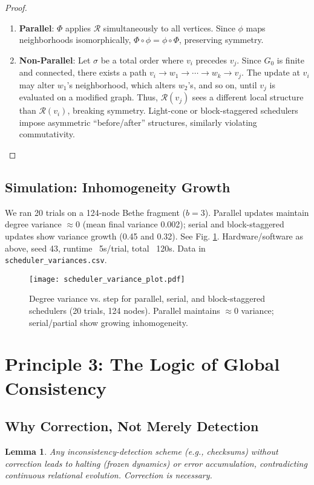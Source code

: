 \documentclass[11pt, a4paper]{article}
\newtheorem{lemma}{Lemma}[section]
\begin{document}
\begin{proof}
\begin{enumerate}
  \item \textbf{Parallel}: $\Phi$ applies $\mathcal{R}$ simultaneously to all vertices. Since $\phi$ maps neighborhoods isomorphically, $\Phi \circ \phi = \phi \circ \Phi$, preserving symmetry.
  \item \textbf{Non-Parallel}: Let $\sigma$ be a total order where $v_i$ precedes $v_j$. Since $G_0$ is finite and connected, there exists a path $v_i \to w_1 \to \cdots \to w_k \to v_j$. The update at $v_i$ may alter $w_1$’s neighborhood, which alters $w_2$’s, and so on, until $v_j$ is evaluated on a modified graph. Thus, $\mathcal{R}(v_j)$ sees a different local structure than $\mathcal{R}(v_i)$, breaking symmetry. Light-cone or block-staggered schedulers impose asymmetric “before/after” structures, similarly violating commutativity.
\end{enumerate}
\end{proof}

\subsection{Simulation: Inhomogeneity Growth}
We ran 20 trials on a 124-node Bethe fragment ($b=3$). Parallel updates maintain degree variance $\approx 0$ (mean final variance 0.002); serial and block-staggered updates show variance growth (0.45 and 0.32). See Fig. \ref{fig:symmetry}. Hardware/software as above, seed 43, runtime ~5s/trial, total ~120s. Data in \texttt{scheduler_variances.csv}.

\begin{figure}[h!]
  \centering
  \texttt{[image: scheduler\_variance\_plot.pdf]} %
  \caption{Degree variance vs. step for parallel, serial, and block-staggered schedulers (20 trials, 124 nodes). Parallel maintains $\approx 0$ variance; serial/partial show growing inhomogeneity.}
  \label{fig:symmetry}
\end{figure}

\section{Principle 3: The Logic of Global Consistency}

\subsection{Why Correction, Not Merely Detection}
\begin{lemma}
\label{lem:correction_needed}
Any inconsistency-detection scheme (e.g., checksums) without correction leads to halting (frozen dynamics) or error accumulation, contradicting continuous relational evolution. Correction is necessary.
\end{lemma}
\end{document}
